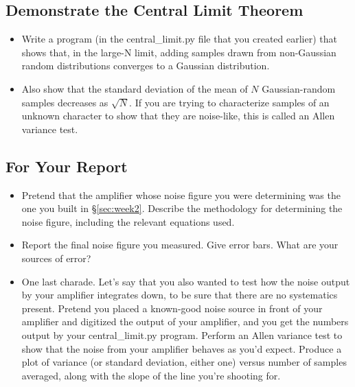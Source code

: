 \documentclass[11pt]{article}
\begin{document}
\subsection{Demonstrate the Central Limit Theorem}
\begin{itemize}[noitemsep,nolistsep]
\item Write a program (in the central\_limit.py file that you created earlier)
that shows that, in the large-N limit, adding samples drawn from non-Gaussian random
distributions converges to a Gaussian distribution.
\item Also show that the standard deviation of the mean of $N$ Gaussian-random samples decreases as $\sqrt{N}$.
If you are trying to characterize samples of an unknown character to show that they are noise-like, this
is called an Allen variance test.
\end{itemize}


\subsection{For Your Report}
\begin{itemize}[noitemsep,nolistsep]
\item Pretend that the amplifier whose noise figure you were determining was the one you built
in \S\ref{sec:week2}.  Describe the methodology for determining the noise figure, including
the relevant equations used.
\item Report the final noise figure you measured.  Give error bars.  What are your sources of error?
\item One last charade.  Let's say that you also wanted to test how the noise output by your
amplifier integrates down, to be sure that there are no systematics present.  Pretend you placed a
known-good noise source in front of your amplifier and digitized the output of your amplifier, and you
get the numbers output by your central\_limit.py program.  Perform an Allen variance test to show
that the noise from your amplifier behaves as you'd expect.  Produce a plot of variance (or standard deviation,
either one) versus number of samples averaged, along with the slope of the line you're shooting for.
\end{itemize}
\end{document}
